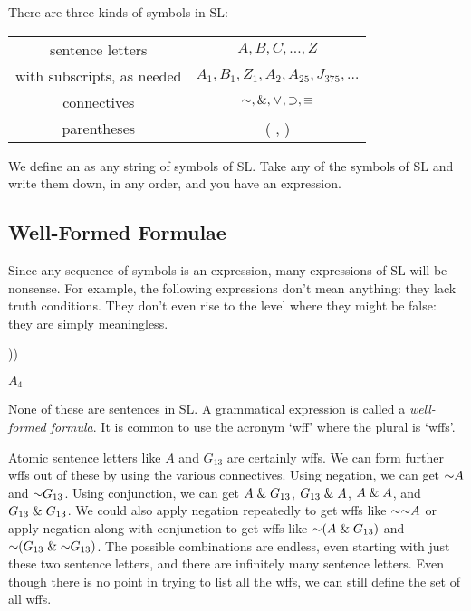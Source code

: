 There are three kinds of symbols in SL:

\begin{center}
\begin{tabular}{|c|c|}
\hline
sentence letters & $A,B,C,\ldots,Z$\\
with subscripts, as needed & $A_1, B_1,Z_1,A_2,A_{25},J_{375},\ldots$\\
\hline
connectives & $\enot,\eand,\eor,\eif,\eiff$\\
\hline
parentheses&( , )\\
\hline
\end{tabular}
\end{center}

We define an  as any string of symbols of SL. Take any of the symbols of SL and write them down, in any order, and you have an expression.


\subsection{Well-Formed Formulae}
\label{sec:wff}

Since any sequence of symbols is an expression, many expressions of SL will be nonsense. For example, the following expressions don't mean anything: {\color{black}they lack truth conditions. They don't even rise to the level where they might be false: they are simply meaningless.}

\begin{earg}
  \item[] \enot\enot\enot\enot
  \item[] ))\eiff
  \item[] $A_4$ \eor
\end{earg}

None of these are sentences in SL.
A grammatical expression is called a \textit{well-formed formula}.
It is common to use the acronym `wff' where the plural is `wffs'.

Atomic sentence letters like $A$ and $G_{13}$ are certainly wffs.
We can form further wffs out of these by using the various connectives.
Using negation, we can get $\enot A$ and $\enot G_{13}$.
Using conjunction, we can get $A \mathrel\& G_{13}$, $G_{13} \mathrel\& A$, $A \mathrel\& A$, and $G_{13} \mathrel\& G_{13}$.
We could also apply negation repeatedly to get wffs like $\enot \enot A$ or apply negation along with conjunction to get wffs like $\enot(A \eand G_{13})$ and $\enot(G_{13} \eand \enot G_{13})$.
The possible combinations are endless, even starting with just these two sentence letters, and there are infinitely many sentence letters.
Even though there is no point in trying to list all the wffs, we can still define the set of all wffs.

